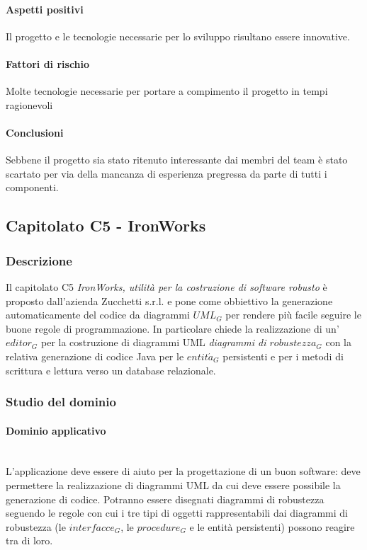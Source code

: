 	\paragraph{Aspetti positivi} \Spazio
	Il progetto e le tecnologie necessarie per lo sviluppo risultano essere innovative.
	\paragraph{Fattori di rischio} \Spazio
     Molte tecnologie necessarie per portare a compimento il progetto in tempi ragionevoli
	

	\paragraph{Conclusioni} \Spazio
	Sebbene il progetto sia stato ritenuto interessante dai membri del team è stato scartato per via della mancanza di esperienza pregressa da parte di tutti i componenti.
	
	\subsection{Capitolato C5 - IronWorks}
		\subsubsection{Descrizione}
		Il capitolato C5 \emph{IronWorks, utilità per la costruzione di software robusto} è proposto dall'azienda Zucchetti s.r.l. e pone come obbiettivo la generazione automaticamente del codice da diagrammi $UML_G$ per rendere più facile seguire le buone regole di programmazione. In particolare chiede la realizzazione di un'$editor_G$ per la costruzione di diagrammi UML \emph{diagrammi di $robustezza_G$} con la relativa generazione di codice Java per le $entit\acute a_G$ persistenti e per i metodi di scrittura e lettura verso un database relazionale. 
		\subsubsection{Studio del dominio}
			\paragraph{Dominio applicativo}
			\mbox{}\\
			L'applicazione deve essere di aiuto per la progettazione di un buon software: deve permettere la realizzazione di diagrammi UML da cui deve essere possibile la generazione di codice. Potranno essere disegnati diagrammi di robustezza seguendo le regole con cui i tre tipi di oggetti rappresentabili dai diagrammi di robustezza (le $interfacce_G$, le $procedure_G$ e le entità persistenti) possono reagire tra di loro.

